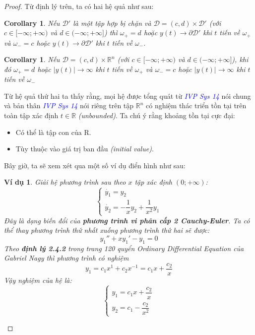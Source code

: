 \documentclass[a4paper]{article}
\newtheorem{example}{Ví dụ}
\newtheorem{corollary}[proposition]{{\bf Corollary}}
\begin{document}
\begin{proof}
Từ định lý trên, ta có hai hệ quả như sau: 
\begin{corollary}
    Nếu $\mathcal{D}'$ là một tập hợp bị chặn và $\mathcal{D} = (c,d) \times \mathcal{D}'$ (với $c \in [-\infty; +\infty)$ và $d \in (-\infty; +\infty]$) thì $\omega_+ = d$ hoặc $y(t) \rightarrow \partial\mathcal{D}'$ khi $t$ tiến về $\omega_+$ và $\omega_- = c$ hoặc $y(t) \rightarrow \partial\mathcal{D}'$ khi $t$ tiến về $\omega_-$.
\end{corollary}
\begin{corollary}
    Nếu $\mathcal{D} = (c,d) \times \mathbb{R}^n$ (với $c \in [-\infty; +\infty)$ và $d \in (-\infty; +\infty] $), khi đó $\omega_+ = d$ hoặc $\vert y(t) \vert \rightarrow \infty$ khi $t$ tiến về $\omega_+$ và $\omega_- = c$ hoặc $\vert y(t) \vert \rightarrow \infty$ khi $t$ tiến về $\omega_-$
\end{corollary}
Từ hệ quả thứ hai ta thấy rằng, mọi hệ được tổng quát từ \textcolor{blue}{\textit{IVP Sys 14}} nói chung và bản thân \textcolor{blue}{\textit{IVP Sys 14}} nói riêng trên tập $ \mathbb{R}^n$ có nghiệm thác triển tồn tại trên toàn tập xác định $t \in \mathbb{R}$ \textit{(unbounded)}.
\newline
Ta chú ý rằng khoảng tồn tại cực đại: 
\begin{itemize}
    \item Có thể là tập con của R.
    \item Tùy thuộc vào giá trị ban đầu \textit{(initial value)}.
\end{itemize}
Bây giờ, ta sẽ xem xét qua một số ví dụ điển hình như sau: 
\begin{example}
    Giải hệ phương trình sau theo $x$ tập xác định $(0;+\infty)$: 
    $$\begin{cases}
        \dot{y_1} = y_2 \\
        \dot{y_2} = -\dfrac{1}{x}y_2 + \dfrac{1}{x^2}y_1
    \end{cases}$$
    Đây là dạng biến đổi của  \textbf{\textit{phương trình vi phân cấp 2 Cauchy-Euler}}. Ta có thể thay phương trình thứ nhất xuống phương trình thứ hai sẽ được: 
    $$
        y_1'' + xy_1' - y_1 = 0
    $$
    Theo \textbf{định lý 2.4.2} trong \textit{trang 120} quyển \textit{Ordinary Differential Equation} của \textit{Gabriel Nagy} thì phương trình có nghiệm 
    $$y_1 = c_1x^1 + c_2 x^{-1} = c_1x + \dfrac{c_2}{x}$$
    Vậy nghiệm của hệ là: 
    $$
    \begin{cases}
        y_1 = c_1x + \dfrac{c_2}{x} \\
        y_2 = c_1 - \dfrac{c_2}{x^2}
    \end{cases}
    $$
\end{example}


\end{proof}
\end{document}
